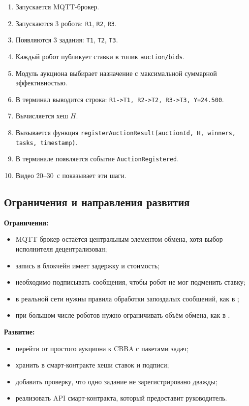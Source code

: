 \documentclass[14pt,a4paper]{extarticle}
\begin{document}
	\begin{enumerate}
		\item Запускается MQTT-брокер.
		\item Запускаются 3 робота: \texttt{R1}, \texttt{R2}, \texttt{R3}.
		\item Появляются 3 задания: \texttt{T1}, \texttt{T2}, \texttt{T3}.
		\item Каждый робот публикует ставки в топик \texttt{auction/bids}.
		\item Модуль аукциона выбирает назначение с максимальной суммарной эффективностью.
		\item В терминал выводится строка: \texttt{R1->T1, R2->T2, R3->T3, Y=24.500}.
		\item Вычисляется хеш \(H\).
		\item Вызывается функция \texttt{registerAuctionResult(auctionId, H, winners, tasks, timestamp)}.
		\item В терминале появляется событие \texttt{AuctionRegistered}.
		\item Видео 20--30~с показывает эти шаги.
	\end{enumerate}
	
	\subsection{Ограничения и направления развития}
	
	\textbf{Ограничения:}
	\begin{itemize}
		\item MQTT-брокер остаётся центральным элементом обмена, хотя выбор исполнителя децентрализован;
		\item запись в блокчейн имеет задержку и стоимость;
		\item необходимо подписывать сообщения, чтобы робот не мог подменить ставку;
		\item в реальной сети нужны правила обработки запоздалых сообщений, как в \cite{johnson2011};
		\item при большом числе роботов нужно ограничивать объём обмена, как в \cite{raja2022}.
	\end{itemize}
	
	\textbf{Развитие:}
	\begin{itemize}
		\item перейти от простого аукциона к CBBA с пакетами задач;
		\item хранить в смарт-контракте хеши ставок и подписи;
		\item добавить проверку, что одно задание не зарегистрировано дважды;
		\item реализовать API смарт-контракта, который предоставит руководитель.
	\end{itemize}
	
\end{document}

